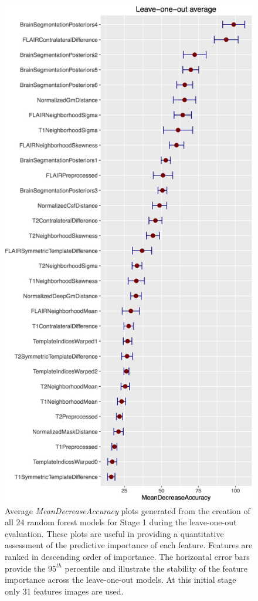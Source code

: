 \documentclass[11pt,]{article}
\begin{document}
\begin{figure}[htbp]
\centering
\includegraphics{Figures/averageLeaveOneOutStage1.png}
\caption{Average \emph{MeanDecreaseAccuracy} plots generated from the
creation of all 24 random forest models for Stage 1 during the
leave-one-out evaluation. These plots are useful in providing a
quantitative assessment of the predictive importance of each feature.
Features are ranked in descending order of importance. The horizontal
error bars provide the \(95^{th}\) percentile and illustrate the
stability of the feature importance across the leave-one-out models. At
this initial stage only 31 features images are used.}
\end{figure}
\end{document}
